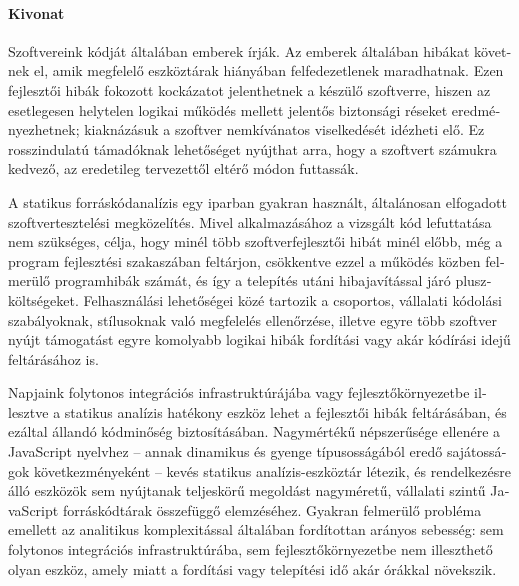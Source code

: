 \begin{otherlanguage}{magyar}

  \paragraph*{Kivonat}
  \thispagestyle{plain}

  Szoftvereink kódját általában emberek írják. Az emberek általában hibákat követnek el, amik megfelelő eszköztárak hiányában felfedezetlenek maradhatnak. Ezen fejlesztői hibák fokozott kockázatot jelenthetnek a készülő szoftverre, hiszen az esetlegesen helytelen logikai működés mellett jelentős biztonsági réseket eredményezhetnek; kiaknázásuk a szoftver nemkívánatos viselkedését idézheti elő. Ez rosszindulatú támadóknak lehetőséget nyújthat arra, hogy a szoftvert számukra kedvező, az eredetileg tervezettől eltérő módon futtassák.

  A statikus forráskódanalízis egy iparban gyakran használt, általánosan elfogadott szoftvertesztelési megközelítés. Mivel alkalmazásához a vizsgált kód lefuttatása nem szükséges, célja, hogy minél több szoftverfejlesztői hibát minél előbb, még a program fejlesztési szakaszában feltárjon, csökkentve ezzel a működés közben felmerülő programhibák számát, és így a telepítés utáni hibajavítással járó pluszköltségeket. Felhasználási lehetőségei közé tartozik a csoportos, vállalati kódolási szabályoknak, stílusoknak való megfelelés ellenőrzése, illetve egyre több szoftver nyújt támogatást egyre komolyabb logikai hibák fordítási vagy akár kódírási idejű feltárásához is.

  Napjaink folytonos integrációs infrastruktúrájába vagy fejlesztőkörnyezetbe illesztve a statikus analízis hatékony eszköz lehet a fejlesztői hibák feltárásában, és ezáltal állandó kódminőség biztosításában. Nagymértékű népszerűsége ellenére a JavaScript nyelvhez – annak dinamikus és gyenge típusosságából eredő sajátosságok következményeként – kevés statikus analízis-eszköztár létezik, és rendelkezésre álló eszközök sem nyújtanak teljeskörű megoldást nagyméretű, vállalati szintű JavaScript forráskódtárak összefüggő elemzéséhez. Gyakran felmerülő probléma emellett az analitikus komplexitással általában fordítottan arányos sebesség: sem folytonos integrációs infrastruktúrába, sem fejlesztőkörnyezetbe nem illeszthető olyan eszköz, amely miatt a fordítási vagy telepítési idő akár órákkal növekszik.


\end{otherlanguage}
